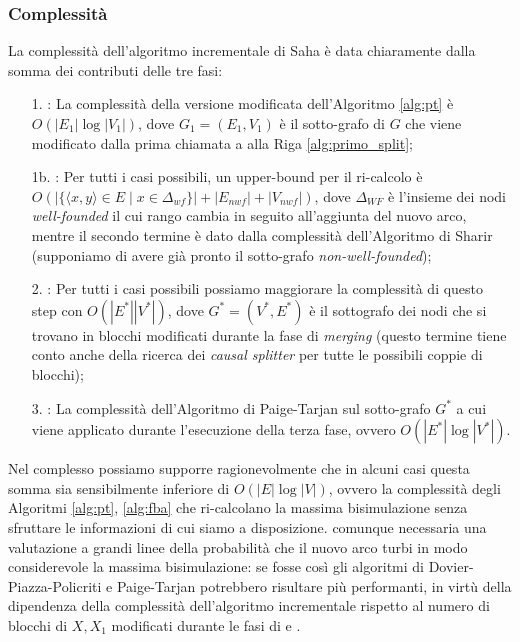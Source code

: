 \subsubsection{Complessità}
La complessità dell'algoritmo incrementale di Saha è data chiaramente dalla somma dei contributi delle tre fasi:
\begin{enumerate}
    \item[1.] : La complessità della versione modificata dell'Algoritmo \ref{alg:pt} è $O(|E_1|\log |V_1|)$, dove $G_1=(E_1, V_1)$ è il sotto-grafo di $G$ che viene modificato dalla prima chiamata a  alla Riga \ref{alg:primo_split};
    \item[1b.] : Per tutti i casi possibili, un upper-bound per il ri-calcolo è $O(|\{\langle x,y\rangle \in E \mid x \in \Delta_{wf}\}| + |E_{nwf}| + |V_{nwf}|)$, dove $\Delta_{WF}$ è l'insieme dei nodi \emph{well-founded} il cui rango cambia in seguito all'aggiunta del nuovo arco, mentre il secondo termine è dato dalla complessità dell'Algoritmo di Sharir \cite{sharir} (supponiamo di avere già pronto il sotto-grafo \emph{non-well-founded});
    \item[2.] : Per tutti i casi possibili possiamo maggiorare la complessità di questo step con $O(|E^*||V^*|)$, dove $G^*=(V^*,E^*)$ è il sottografo dei nodi che si trovano in blocchi modificati durante la fase di \emph{merging} (questo termine tiene conto anche della ricerca dei \emph{causal splitter} per tutte le possibili coppie di blocchi);
    \item[3.] : La complessità dell'Algoritmo di Paige-Tarjan sul sotto-grafo $G^*$ a cui viene applicato durante l'esecuzione della terza fase, ovvero $O(|E^*| \log |V^*|)$.
\end{enumerate}

Nel complesso possiamo supporre ragionevolmente che in alcuni casi questa somma sia sensibilmente inferiore di $O(|E| \log |V|)$, ovvero la complessità degli Algoritmi \ref{alg:pt}, \ref{alg:fba} che ri-calcolano la massima bisimulazione senza sfruttare le informazioni di cui siamo a disposizione. \accente comunque necessaria una valutazione a grandi linee della probabilità che il nuovo arco turbi in modo considerevole la massima bisimulazione: se fosse così gli algoritmi di Dovier-Piazza-Policriti e Paige-Tarjan potrebbero risultare più performanti, in virtù della dipendenza della complessità dell'algoritmo incrementale rispetto al numero di blocchi di $X, X_1$ modificati durante le fasi di  e .
